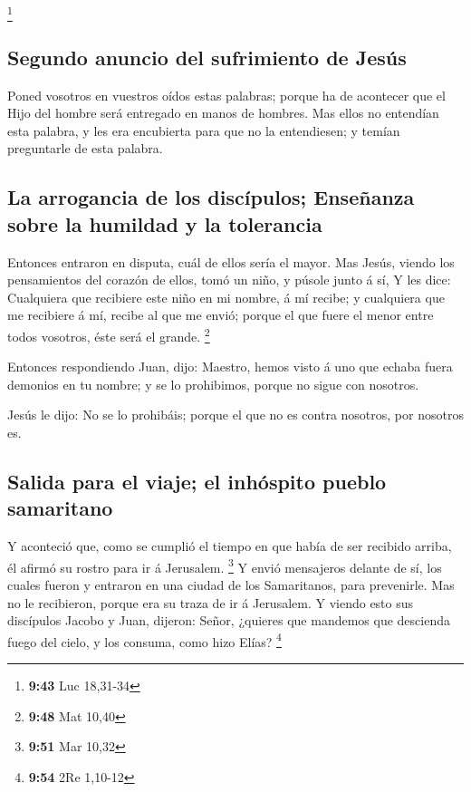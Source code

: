 \footnote{\textbf{9:43} Luc 18,31-34}

\hypertarget{segundo-anuncio-del-sufrimiento-de-jesuxfas}{%
\subsection{Segundo anuncio del sufrimiento de
Jesús}\label{segundo-anuncio-del-sufrimiento-de-jesuxfas}}

 Poned vosotros en vuestros oídos estas palabras; porque
ha de acontecer que el Hijo del hombre será entregado en manos de
hombres.  Mas ellos no entendían esta palabra, y les era
encubierta para que no la entendiesen; y temían preguntarle de esta
palabra.

\hypertarget{la-arrogancia-de-los-discuxedpulos-enseuxf1anza-sobre-la-humildad-y-la-tolerancia}{%
\subsection{La arrogancia de los discípulos; Enseñanza sobre la humildad
y la
tolerancia}\label{la-arrogancia-de-los-discuxedpulos-enseuxf1anza-sobre-la-humildad-y-la-tolerancia}}

 Entonces entraron en disputa, cuál de ellos sería el
mayor.  Mas Jesús, viendo los pensamientos del corazón de
ellos, tomó un niño, y púsole junto á sí,  Y les dice:
Cualquiera que recibiere este niño en mi nombre, á mí recibe; y
cualquiera que me recibiere á mí, recibe al que me envió; porque el que
fuere el menor entre todos vosotros, éste será el grande. \footnote{\textbf{9:48}
  Mat 10,40}

 Entonces respondiendo Juan, dijo: Maestro, hemos visto á
uno que echaba fuera demonios en tu nombre; y se lo prohibimos, porque
no sigue con nosotros.

 Jesús le dijo: No se lo prohibáis; porque el que no es
contra nosotros, por nosotros es.

\hypertarget{salida-para-el-viaje-el-inhuxf3spito-pueblo-samaritano}{%
\subsection{Salida para el viaje; el inhóspito pueblo
samaritano}\label{salida-para-el-viaje-el-inhuxf3spito-pueblo-samaritano}}

 Y aconteció que, como se cumplió el tiempo en que había
de ser recibido arriba, él afirmó su rostro para ir á Jerusalem.
\footnote{\textbf{9:51} Mar 10,32}  Y envió mensajeros
delante de sí, los cuales fueron y entraron en una ciudad de los
Samaritanos, para prevenirle.  Mas no le recibieron,
porque era su traza de ir á Jerusalem.  Y viendo esto sus
discípulos Jacobo y Juan, dijeron: Señor, ¿quieres que mandemos que
descienda fuego del cielo, y los consuma, como hizo Elías? \footnote{\textbf{9:54}
  2Re 1,10-12}

